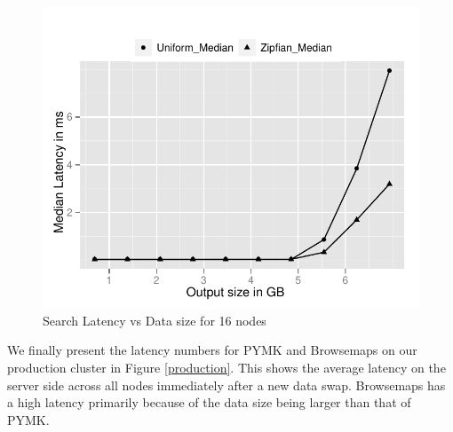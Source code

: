 \begin{figure}
  \centering
    \includegraphics[scale=0.55]{images/search_16node.pdf}
  \caption{Search Latency vs Data size for 16 nodes}
  \label{16search}
\end{figure}


We finally present the latency numbers for PYMK and Browsemaps on our production cluster in Figure \ref{production}. This shows the average latency on the server side across all nodes immediately after a new data swap. Browsemaps has a high latency primarily because of the data size being larger than that of PYMK.

